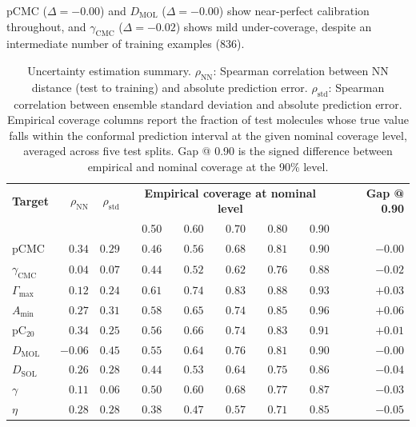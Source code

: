 \documentclass[11pt]{aime}
\begin{document}
pCMC ($\Delta = -0.00$) and $D_{\mathrm{MOL}}$ ($\Delta = -0.00$) show near-perfect calibration throughout, and $\gamma_{\mathrm{CMC}}$ ($\Delta = -0.02$) shows mild under-coverage, despite an intermediate number of training examples (836).

\begin{table}[ht]
\centering
\begin{tabular}{lrrrrrrrr}
\toprule
\textbf{Target} & $\rho_\mathrm{NN}$ & $\rho_\mathrm{std}$ & \multicolumn{5}{c}{\textbf{Empirical coverage at nominal level}} & \textbf{Gap @ 0.90}\\
 & & & 0.50 & 0.60 & 0.70 & 0.80 & 0.90 & \\
\midrule
pCMC                        & $0.34$ & $0.29$ & $0.46$ & $0.56$ & $0.68$ & $0.81$ & $0.90$ & $-0.00$ \\
$\gamma_{\mathrm{CMC}}$     & $0.04$ & $0.07$ & $0.44$ & $0.52$ & $0.62$ & $0.76$ & $0.88$ & $-0.02$ \\
$\Gamma_{\max}$             & $0.12$ & $0.24$ & $0.61$ & $0.74$ & $0.83$ & $0.88$ & $0.93$ & $+0.03$ \\
$A_{\min}$                  & $0.27$ & $0.31$ & $0.58$ & $0.65$ & $0.74$ & $0.85$ & $0.96$ & $+0.06$ \\
pC$_{20}$                   & $0.34$ & $0.25$ & $0.56$ & $0.66$ & $0.74$ & $0.83$ & $0.91$ & $+0.01$ \\
$D_{\mathrm{MOL}}$          & $-0.06$ & $0.45$ & $0.55$ & $0.64$ & $0.76$ & $0.81$ & $0.90$ & $-0.00$ \\
$D_{\mathrm{SOL}}$          & $0.26$ & $0.28$ & $0.44$ & $0.53$ & $0.64$ & $0.75$ & $0.86$ & $-0.04$ \\
$\gamma$                    & $0.11$ & $0.06$ & $0.50$ & $0.60$ & $0.68$ & $0.77$ & $0.87$ & $-0.03$ \\
$\eta$                      & $0.28$ & $0.28$ & $0.38$ & $0.47$ & $0.57$ & $0.71$ & $0.85$ & $-0.05$ \\
\bottomrule
\end{tabular}
\caption{Uncertainty estimation summary. $\rho_\mathrm{NN}$: Spearman correlation between NN distance (test to training) and absolute prediction error. $\rho_\mathrm{std}$: Spearman correlation between ensemble standard deviation and absolute prediction error.
Empirical coverage columns report the fraction of test molecules whose true value falls within the conformal prediction interval at the given nominal coverage level, averaged across five test splits.
Gap @ 0.90 is the signed difference between empirical and nominal coverage at the 90\% level.}
\label{tab:conformal_coverage}
\end{table}
\end{document}
